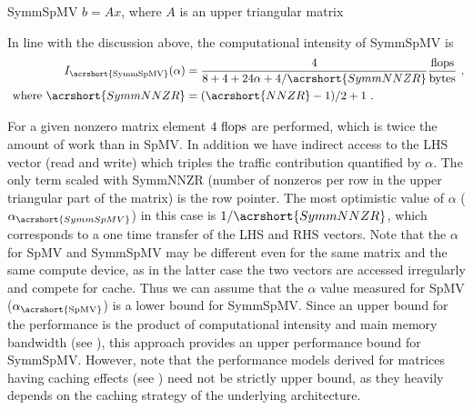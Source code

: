 \begin{algorithm}[t]
	\caption{SymmSpMV $b=Ax$, where $A$ is an upper triangular matrix} 
	\label{alg:SymmSpMV}
	\begin{algorithmic}[1]
			\ENDFOR
		\ENDFOR
	\end{algorithmic}
\end{algorithm}
In line with the discussion above, the computational intensity of \acrshort{SymmSpMV} is
\begin{align}
\label{eq:SymmSpMV_intensity}
I_\mathrm{\acrshort{SymmSpMV}} (\alpha) &= \frac{4}{8+4+24\alpha+4/\acrshort{SymmNNZR}} \frac{\FLOP}{\BYTE}\cma\\
\label{eq:NNZR_symm}
\text{ where  } \acrshort{SymmNNZR} &= (\acrshort{NNZR}-1)/2 + 1\eos
\end{align}

For a given nonzero matrix element $4~\mbox{flops}$ are performed, which is
twice the amount of work than in \acrshort{SpMV}. In addition we have
indirect access to the LHS vector (read and write) which triples the
traffic contribution quantified by $\alpha$\@. The only term scaled
with \acrshort{SymmNNZR} (number of nonzeros per row in the upper
triangular part of the matrix) is the row pointer. The most optimistic
value of $\alpha$ ($\alpha_{\acrshort{SymmSpMV}}$) in this case is
$1/{\acrshort{SymmNNZR}}$, which corresponds to a one time transfer of
the LHS and RHS vectors.  Note that the $\alpha$ for \acrshort{SpMV}
and \acrshort{SymmSpMV} may be different even for the same matrix and
the same compute device, as in the latter case the two vectors are
accessed irregularly and compete for cache. Thus we
can assume that the $\alpha$ value measured for \acrshort{SpMV}
($\alpha_\mathrm{\acrshort{SpMV}}$) is a lower bound
for \acrshort{SymmSpMV}.  Since an upper bound for the performance is the
product of computational intensity and main memory bandwidth
(see ), this approach provides an upper
performance bound for \acrshort{SymmSpMV}.  However, note that the
performance models derived for matrices having caching effects
(see ) need not be strictly upper bound, as
they heavily depends on the caching strategy of the underlying
architecture.
\begin{comment}
 for a given matrix structure:
 \begin{align}
\label{eq:SymmSpMV_performance}
P^{max}_\mathrm{\acrshort{SymmSpMV}}  &= I_\mathrm{\acrshort{SymmSpMV}} (\alpha_\mathrm{\acrshort{SpMV}})  \times b_S
\end{align}
As most matrices have a considerable number of nonzeros per row, we chose $b_S$ to be the optimistic (load-only) value  from~\Cref{tab:test_bed}.
\end{comment}

